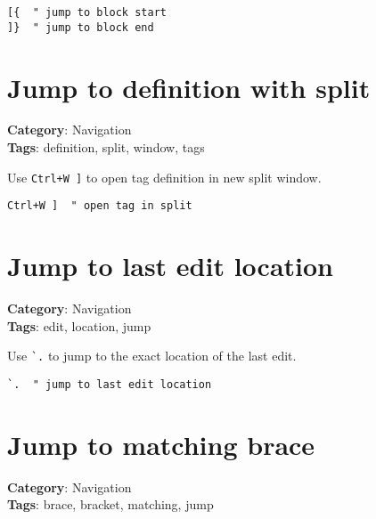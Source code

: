 {{{{{{{{{\begin{Exa*}{}
\begin{Verbatim}[fontsize=\footnotesize, breaklines, breakanywhere]
[{  " jump to block start
]}  " jump to block end
\end{Verbatim}
\end{Exa*}

\section{Jump to definition with split}

\textbf{Category}: Navigation\\ \textbf{Tags}: definition, split, window, tags
\vspace{0.5cm}

Use {\footnotesize \Verb§Ctrl+W ]§} to open tag definition in new split window.

\begin{Exa*}{}
\begin{Verbatim}[fontsize=\footnotesize, breaklines, breakanywhere]
Ctrl+W ]  " open tag in split
\end{Verbatim}
\end{Exa*}

\section{Jump to last edit location}

\textbf{Category}: Navigation\\ \textbf{Tags}: edit, location, jump
\vspace{0.5cm}

Use {\footnotesize \Verb§`.§} to jump to the exact location of the last edit.

\begin{Exa*}{}
\begin{Verbatim}[fontsize=\footnotesize, breaklines, breakanywhere]
`.  " jump to last edit location
\end{Verbatim}
\end{Exa*}

\section{Jump to matching brace}

\textbf{Category}: Navigation\\ \textbf{Tags}: brace, bracket, matching, jump
\vspace{0.5cm}

}}}}}}}}}
